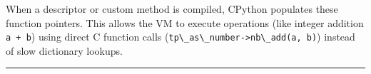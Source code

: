 When a descriptor or custom method is compiled, CPython populates these
function pointers. This allows the VM to execute operations (like
integer addition \passthrough{\lstinline!a + b!}) using direct C
function calls (\passthrough{\lstinline!tp\_as\_number->nb\_add(a, b)!})
instead of slow dictionary lookups.

\begin{center}\rule{0.5\linewidth}{0.5pt}\end{center}
